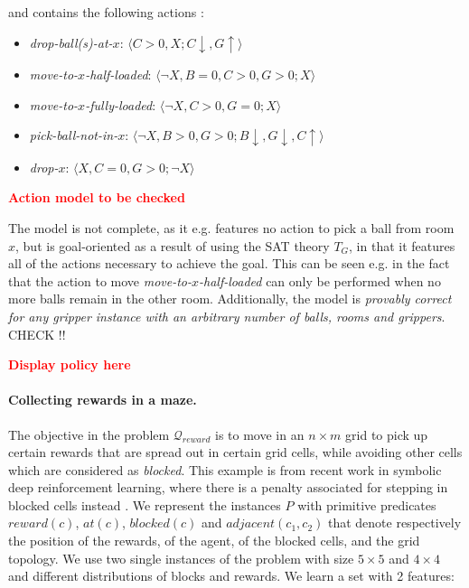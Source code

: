 \documentclass[letterpaper]{article} %
\newcommand{\tuple}[1]{\ensuremath{\langle #1 \rangle}}
\newcommand{\alert}[1]{\textcolor{red}{\bf #1}}
\newcommand{\Q}{\mathcal{Q}}
\begin{document}
\noindent and contains the following actions :


\begin{itemize}
\item \emph{drop-ball(s)-at-$x$}: \tuple{C>0, X;  C\downarrow, G \uparrow}
\item \emph{move-to-$x$-half-loaded}: \tuple{\neg X, B=0, C>0, G>0;   X}
\item \emph{move-to-$x$-fully-loaded}: \tuple{\neg X, C>0, G=0;   X}
\item \emph{pick-ball-not-in-$x$}: \tuple{\neg X, B > 0, G > 0;   B \downarrow, G \downarrow, C\uparrow}
\item \emph{drop-$x$}: \tuple{X, C=0, G > 0;   \neg X}
\end{itemize}
\noindent \alert{Action model to be checked}


The model is not complete, as it e.g. features no action to pick a ball from room $x$,
but is goal-oriented as a result of using the SAT theory $T_G$, in that it features all of the actions
necessary to achieve the goal.
This can be seen e.g. in the fact that the action to move \emph{move-to-$x$-half-loaded}
can only be performed when no more balls remain in the other room.
Additionally, the model is \emph{provably correct for any gripper instance with an arbitrary number of balls, 
rooms and grippers}. CHECK !!


\alert{Display policy here}


% 
% 
% 
% 




\paragraph{Collecting rewards in a maze.}
The objective in the problem $\Q_{reward}$ is to move in an $n \times m$ grid to pick up certain
rewards that are spread out in certain grid cells, while avoiding other cells which are considered as \emph{blocked}.
This example is from recent work in symbolic deep
reinforcement learning, where there is a penalty associated for
stepping in blocked cells instead \cite{garnelo2016towards}.
%
We represent the instances $P$ with primitive predicates $reward(c)$, $at(c)$, $blocked(c)$ and $adjacent(c_1, c_2)$ that denote
respectively the position of the rewards, of the agent, of the blocked cells, and the grid topology.
We use two single instances of the problem with size $5 \times 5$ and $4 \times 4$ and different distributions of blocks and rewards.
We learn a set with 2 features:
\end{document}
